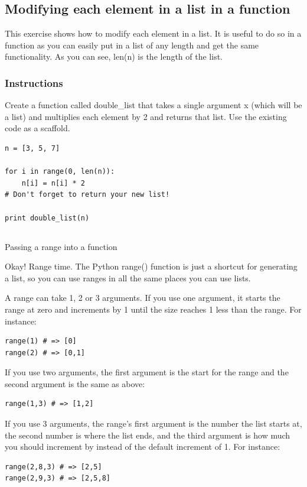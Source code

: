 \documentclass[12pt,a4paper,final,twoside,onecolumn,titlepage]{book}
\begin{document}
\subsection{Modifying each element in a list in a function}

This exercise shows how to modify each element in a list. It is useful to do so in a function as you can easily put in a list of any length and get the same functionality. As you can see, len(n) is the length of the list.
\subsubsection{Instructions}

Create a function called double\_list that takes a single argument x (which will be a list) and multiplies each element by 2 and returns that list. Use the existing code as a scaffold.
\begin{lstlisting}
n = [3, 5, 7]

for i in range(0, len(n)):
    n[i] = n[i] * 2
# Don't forget to return your new list!

print double_list(n)
\end{lstlisting}

\subsection{}
Passing a range into a function

Okay! Range time. The Python range() function is just a shortcut for generating a list, so you can use ranges in all the same places you can use lists.

A range can take 1, 2 or 3 arguments. If you use one argument, it starts the range at zero and increments by 1 until the size reaches 1 less than the range. For instance:
\begin{lstlisting}
range(1) # => [0]
range(2) # => [0,1]
\end{lstlisting}
If you use two arguments, the first argument is the start for the range and the second argument is the same as above:
\begin{lstlisting}
range(1,3) # => [1,2]
\end{lstlisting}
If you use 3 arguments, the range's first argument is the number the list starts at, the second number is where the list ends, and the third argument is how much you should increment by instead of the default increment of 1. For instance:
\begin{lstlisting}
range(2,8,3) # => [2,5]
range(2,9,3) # => [2,5,8]
\end{lstlisting}
\end{document}
